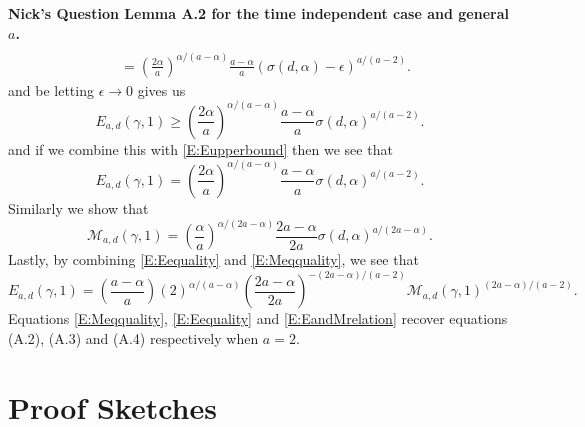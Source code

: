 \documentclass[a4paper,11pt]{article}
\numberwithin{equation}{section}
\theoremstyle{plain}
\theoremstyle{definition}
\newcounter{NQ}
\newenvironment{NickQuestion}[1][] %
{\refstepcounter{NQ}
	\begin{mdframed}[backgroundcolor=lightgray]\textbf{Nick's Question \theNQ \: #1~~}~~~\noindent}%
	{\end{mdframed}}
\numberwithin{NQ}{section}
\numberwithin{LQ}{section}
\numberwithin{ZQ}{section}
\begin{document}
\begin{NickQuestion}[Lemma A.2 \cite{15AIHP} for the time independent case and general $a$.]
\begin{align*}
			\\& = \left(\frac{2\alpha}{a}\right)^{\alpha/(a-\alpha)}\frac{a-\alpha}{a}(\sigma(d,\alpha)-\epsilon)^{a/(a-2)}.
	\end{align*}
and be letting $\epsilon \to 0$ gives us
	\begin{equation}\label{E:Elowerbound}
		E_{a,d}(\gamma,1) \ge\left(\frac{2\alpha}{a}\right)^{\alpha/(a-\alpha)}\frac{a-\alpha}{a}\sigma(d,\alpha)^{a/(a-2)}.
	\end{equation}
and if we combine this with \eqref{E:Eupperbound} then we see that
	\begin{equation}\label{E:Eequality}
			E_{a,d}(\gamma,1) = \left(\frac{2\alpha}{a}\right)^{\alpha/(a-\alpha)}\frac{a-\alpha}{a}\sigma(d,\alpha)^{a/(a-2)}.
	\end{equation}
Similarly we show that
	\begin{equation}\label{E:Meqquality}
			\mathcal{M}_{a,d}(\gamma,1) = \left( \frac{\alpha}{a}\right)^{\alpha/(2a-\alpha)} \frac{2a-\alpha}{2a}\sigma(d,\alpha)^{a/(2a-\alpha)}.
	\end{equation}
Lastly, by combining \eqref{E:Eequality} and \eqref{E:Meqquality}, we see that
	\begin{equation} \label{E:EandMrelation}
		E_{a,d}(\gamma,1) = \left( \frac{a-\alpha}{a}\right)(2)^{\alpha/(a-\alpha)}\left( \frac{2a-\alpha}{2a} \right)^{-(2a-\alpha)/(a-2)}\mathcal{M}_{a,d}(\gamma,1)^{(2a-\alpha)/(a-2)} .
	\end{equation}
Equations \eqref{E:Meqquality}, \eqref{E:Eequality} and \eqref{E:EandMrelation} recover equations (A.2), (A.3) and (A.4) \cite{15AIHP} respectively when $a=2$.
\end{NickQuestion}
	\section{Proof Sketches}
\end{document}

